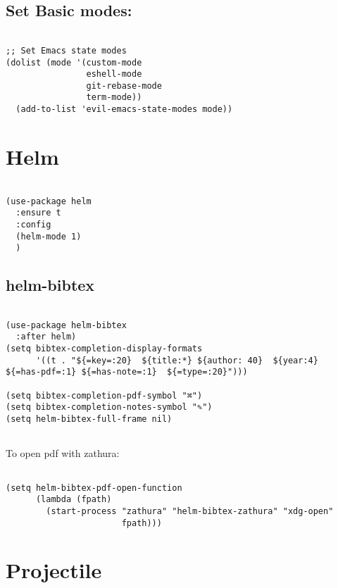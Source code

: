 \documentclass[11pt]{article}
\begin{document}
\subsection{Set Basic modes:}
\label{sec:org3461e11}

\begin{verbatim}

;; Set Emacs state modes
(dolist (mode '(custom-mode
				eshell-mode
				git-rebase-mode
				term-mode))
  (add-to-list 'evil-emacs-state-modes mode))

\end{verbatim}

\section{Helm}
\label{sec:org51b5874}

\begin{verbatim}

(use-package helm
  :ensure t
  :config
  (helm-mode 1)
  )

\end{verbatim}

\subsection{helm-bibtex}
\label{sec:orgcbbba17}

\begin{verbatim}

(use-package helm-bibtex
  :after helm)
(setq bibtex-completion-display-formats
	  '((t . "${=key=:20}  ${title:*} ${author: 40}  ${year:4}  ${=has-pdf=:1} ${=has-note=:1}  ${=type=:20}")))

(setq bibtex-completion-pdf-symbol "⌘")
(setq bibtex-completion-notes-symbol "✎")
(setq helm-bibtex-full-frame nil)


\end{verbatim}

To open pdf with zathura:

\begin{verbatim}

(setq helm-bibtex-pdf-open-function
	  (lambda (fpath)
		(start-process "zathura" "helm-bibtex-zathura" "xdg-open"
					   fpath)))

\end{verbatim}

\section{Projectile}
\label{sec:orgd10cec0}
\end{document}
